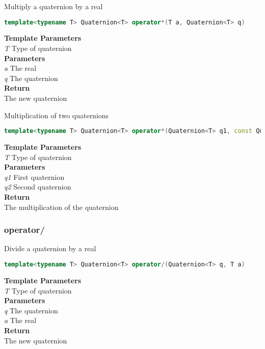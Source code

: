 \begin{mdframed}
Multiply a quaternion by a real
\begin{lstlisting}[language=C++]
template<typename T> Quaternion<T> operator*(T a, Quaternion<T> q) 
\end{lstlisting}
\textbf{Template Parameters} \\ 
\textit{T} Type of quaternion \\ 
\textbf{Parameters} \\ 
\textit{a} The real \\ 
\textit{q} The quaternion \\ 
\textbf{Return} \\ 
The new quaternion\\ 
\end{mdframed}

\begin{mdframed}
Multiplication of two quaternions
\begin{lstlisting}[language=C++]
template<typename T> Quaternion<T> operator*(Quaternion<T> q1, const Quaternion<T>& q2) 
\end{lstlisting}
\textbf{Template Parameters} \\ 
\textit{T} Type of quaternion \\ 
\textbf{Parameters} \\ 
\textit{q1} First quaternion \\ 
\textit{q2} Second quaternion \\ 
\textbf{Return} \\ 
The multiplication of the quaternion\\ 
\end{mdframed}

\subsubsection{operator/}
\begin{mdframed}
Divide a quaternion by a real
\begin{lstlisting}[language=C++]
template<typename T> Quaternion<T> operator/(Quaternion<T> q, T a) 
\end{lstlisting}
\textbf{Template Parameters} \\ 
\textit{T} Type of quaternion \\ 
\textbf{Parameters} \\ 
\textit{q} The quaternion \\ 
\textit{a} The real \\ 
\textbf{Return} \\ 
The new quaternion\\ 
\end{mdframed}


